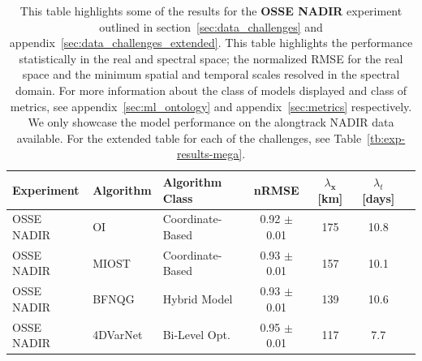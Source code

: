 \begin{table}[h]
\caption{This table highlights some of the results for the \textbf{OSSE NADIR} experiment outlined in section~\ref{sec:data_challenges} and appendix~\ref{sec:data_challenges_extended}.
This table highlights the performance statistically in the real and spectral space; the normalized RMSE for the real space and the minimum spatial and temporal scales resolved in the spectral domain. 
For more information about the class of models displayed and class of metrics, see appendix~\ref{sec:ml_ontology} and appendix~\ref{sec:metrics} respectively. We only showcase the model performance on the alongtrack NADIR data available. For the extended table for each of the challenges, see Table~\ref{tb:exp-results-mega}.}
\label{tb:oceanbench_results}
\centering
\begin{tabular}{lllcccc}
 \toprule
Experiment &  Algorithm &   Algorithm Class &  nRMSE & $\lambda_{\mathbf{x}}$ [km]  & $\lambda_{t}$ [days]      \\ \midrule
\multicolumn{1}{l}{OSSE NADIR}     &  OI~\cite{DUACS} &  Coordinate-Based & 0.92 $\pm$ 0.01 & 175 & 10.8 \\
\multicolumn{1}{l}{OSSE NADIR}     &  MIOST~\cite{MIOST} &  Coordinate-Based  & 0.93 $\pm$ 0.01 & 157 & 10.1 \\
\multicolumn{1}{l}{OSSE NADIR}     &  BFNQG~\cite{BFNQG} &  Hybrid Model   & 0.93 $\pm$ 0.01 & 139 & 10.6 \\
OSSE NADIR &  4DVarNet~\cite{4DVARNETSWOT} &  Bi-Level Opt.  & 0.95 $\pm$ 0.01 & 117 & 7.7 \\
\bottomrule
\end{tabular}
\end{table}

